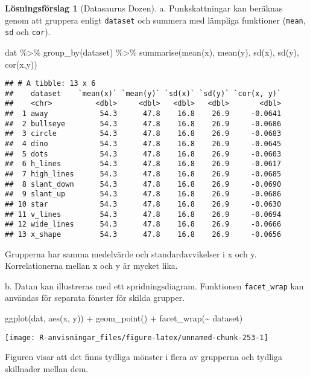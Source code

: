 \documentclass[
]{book}
\newenvironment{Shaded}{\begin{snugshade}}{\end{snugshade}}
\newcommand{\FunctionTok}[1]{\textcolor[rgb]{0.00,0.00,0.00}{#1}}
\newcommand{\NormalTok}[1]{#1}
\newcommand{\SpecialCharTok}[1]{\textcolor[rgb]{0.00,0.00,0.00}{#1}}
\theoremstyle{definition}
\theoremstyle{definition}
\theoremstyle{definition}
\theoremstyle{definition}
\newtheorem{hypothesis}{Lösningsförslag}[chapter]
\theoremstyle{remark}
\begin{document}
\begin{hypothesis}[Datasaurus Dozen]
a. Punkskattningar kan beräknas genom att gruppera enligt \texttt{dataset} och summera med lämpliga funktioner (\texttt{mean}, \texttt{sd} och \texttt{cor}).

\begin{Shaded}
\begin{Highlighting}[]
\NormalTok{dat }\SpecialCharTok{\%\textgreater{}\%}
  \FunctionTok{group\_by}\NormalTok{(dataset) }\SpecialCharTok{\%\textgreater{}\%} 
  \FunctionTok{summarise}\NormalTok{(}\FunctionTok{mean}\NormalTok{(x), }\FunctionTok{mean}\NormalTok{(y), }\FunctionTok{sd}\NormalTok{(x), }\FunctionTok{sd}\NormalTok{(y), }\FunctionTok{cor}\NormalTok{(x,y))}
\end{Highlighting}
\end{Shaded}

\begin{verbatim}
## # A tibble: 13 x 6
##    dataset    `mean(x)` `mean(y)` `sd(x)` `sd(y)` `cor(x, y)`
##    <chr>          <dbl>     <dbl>   <dbl>   <dbl>       <dbl>
##  1 away            54.3      47.8    16.8    26.9     -0.0641
##  2 bullseye        54.3      47.8    16.8    26.9     -0.0686
##  3 circle          54.3      47.8    16.8    26.9     -0.0683
##  4 dino            54.3      47.8    16.8    26.9     -0.0645
##  5 dots            54.3      47.8    16.8    26.9     -0.0603
##  6 h_lines         54.3      47.8    16.8    26.9     -0.0617
##  7 high_lines      54.3      47.8    16.8    26.9     -0.0685
##  8 slant_down      54.3      47.8    16.8    26.9     -0.0690
##  9 slant_up        54.3      47.8    16.8    26.9     -0.0686
## 10 star            54.3      47.8    16.8    26.9     -0.0630
## 11 v_lines         54.3      47.8    16.8    26.9     -0.0694
## 12 wide_lines      54.3      47.8    16.8    26.9     -0.0666
## 13 x_shape         54.3      47.8    16.8    26.9     -0.0656
\end{verbatim}

Grupperna har samma medelvärde och standardavvikelser i x och y. Korrelationerna mellan x och y är mycket lika.

b. Datan kan illustreras med ett spridningsdiagram. Funktionen \texttt{facet\_wrap} kan användas för separata fönster för skilda grupper.

\begin{Shaded}
\begin{Highlighting}[]
\FunctionTok{ggplot}\NormalTok{(dat, }\FunctionTok{aes}\NormalTok{(x, y)) }\SpecialCharTok{+}
  \FunctionTok{geom\_point}\NormalTok{() }\SpecialCharTok{+}
  \FunctionTok{facet\_wrap}\NormalTok{(}\SpecialCharTok{\textasciitilde{}}\NormalTok{ dataset)}
\end{Highlighting}
\end{Shaded}

\begin{center}\texttt{[image: R-anvisningar\_files/figure-latex/unnamed-chunk-253-1]} \end{center}

Figuren visar att det finns tydliga mönster i flera av grupperna och tydliga skillnader mellan dem.
\end{hypothesis}
\end{document}
